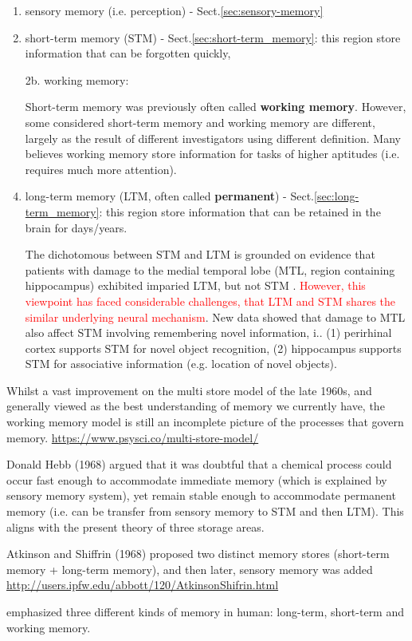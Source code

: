 \begin{enumerate}
  \item sensory memory (i.e. perception) - Sect.\ref{sec:sensory-memory}

  \item short-term memory (STM) - Sect.\ref{sec:short-term_memory}: this region
  store information that can be forgotten quickly,

  \item [2b.]working memory: 
    
Short-term memory was previously often called {\bf working memory}.
However, some considered short-term memory and working memory are different,
largely as the result of different investigators using different definition.
Many believes working memory store information for tasks of higher aptitudes
(i.e. requires much more attention). 

    \item long-term memory (LTM, often called {\bf permanent}) -
    Sect.\ref{sec:long-term_memory}: this region store information that can be
    retained in the brain for days/years.
    
The dichotomous between STM and LTM is grounded on evidence that patients with
damage to the medial temporal lobe (MTL, region containing hippocampus)
exhibited imparied LTM, but not STM  \citep{squire1992}.
\textcolor{red}{However, this viewpoint has faced considerable challenges, that
LTM and STM shares the similar underlying neural mechanism}. New data showed
that damage to MTL also affect STM involving remembering novel information, i.. 
(1) perirhinal cortex supports STM for novel object recognition, (2) hippocampus
supports STM for associative information (e.g. location of novel objects).
   
\end{enumerate}

Whilst a vast improvement on the multi store model of the late 1960s, and
generally viewed as the best understanding of memory we currently have, the
working memory model is still an incomplete picture of the processes that govern
memory.
\url{https://www.psysci.co/multi-store-model/}

\begin{mdframed}
Donald Hebb (1968) argued that it was doubtful that a chemical process could
occur fast enough to accommodate immediate memory (which is explained by
sensory memory system), yet remain stable enough to accommodate permanent
memory (i.e. can be transfer from sensory memory to STM and then LTM). This
aligns with the present theory of three storage areas.

Atkinson and Shiffrin (1968) proposed two distinct memory stores
(short-term memory + long-term memory), and then later, sensory memory was added
\url{http://users.ipfw.edu/abbott/120/AtkinsonShifrin.html}

\citep{cowan2008} emphasized three different
kinds of memory in human: long-term, short-term and working memory.
\end{mdframed}


